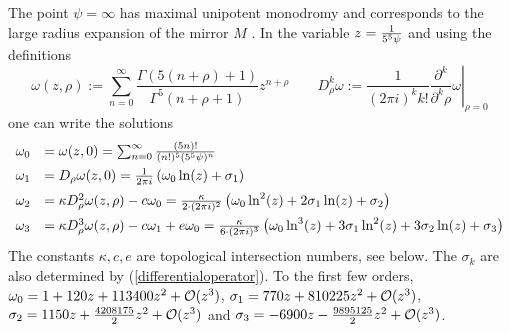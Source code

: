 \documentclass[12pt]{article}
\begin{document}
The point $\psi=\infty$  has maximal unipotent monodromy and
corresponds to the large radius expansion of the mirror $M$
\cite{Candelas:1990rm}. In the variable $z={1\over 5^5\psi}$ and using the definitions
\begin{equation}
\omega(z,\rho):= \sum
_{n=0}^{\infty}\frac{\Gamma(5(n+\rho)+1)}{\Gamma^5(n+\rho+1)} z^{n
+\rho}\qquad D^k_\rho \omega:=\left.\frac{1}{(2\pi i)^k k!}\frac{\partial^k}{\partial^k \rho}\omega\right|_{\rho=0}
\end{equation}
one can write  the solutions~\cite{Hosono:1994ax}
\begin{equation}
\begin{array}{rl}
\omega_0&= \omega(z,0)=\sum _{n=0}^{\infty}
\frac{(5n)!}{(n!)^5(5^5\psi)^{n}}\\[ 2mm]
\omega_1&=D_\rho \omega(z,0)={1\over 2 \pi i} \left(\omega_0 \ln(z)+\sigma_1\right)\\[ 2mm]
\omega_2&= \kappa D^2_\rho \omega(z,\rho)-c \omega_0={\kappa\over 2\cdot  (2 \pi i)^2 }\left( \omega_0 \ln^2(z)+2 \sigma_1 \ln(z)+\sigma_2\right) \\[2 mm]
\omega_3&= \kappa D^3_\rho \omega(z,\rho)-c \omega_1+e \omega_0=\frac{\kappa}{6 \cdot  (2 \pi i)^3 }\left( \omega_0 \ln^3(z)+3 \sigma_1 \ln^2(z)+3 \sigma_2\ln(z)+\sigma_3\right)
\end{array}
\label{rawbasis}
\end{equation}
The constants $\kappa,c,e$ are topological intersection numbers,
see below. The $\sigma_k$ are also determined by
(\ref{differentialoperator}). To the first few orders,
$\omega_0=1+120 z+113400z^2+{\cal O}(z^3)$, $\sigma_1=770z+810225
z^2+{\cal O}(z^3)$, $\sigma_2=1150z+{4208175\over 2} z^2+{\cal
O}(z^3)$ and $\sigma_3=-6900z-{9895125\over 2}z^2+{\cal O}(z^3)$.
\end{document}
